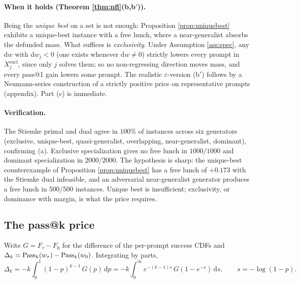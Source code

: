 \paragraph{When it holds (Theorem \ref{thm:nfl}(b,b$'$)).}
Being the \emph{unique best} on a set is not enough: Proposition
\ref{prop:uniquebest} exhibits a unique-best instance with a free lunch, where a
near-generalist absorbs the defunded mass. What suffices is \emph{exclusivity}.
Under Assumption \ref{ass:spec}, any $\mathrm{d}w$ with $\mathrm{d}w_j<0$ (one
exists whenever $\mathrm{d}w\ne0$) strictly lowers every prompt in
$X_j^{\mathrm{excl}}$, since only $j$ solves them; so no non-regressing direction
moves mass, and every pass@1 gain lowers some prompt. The realistic
$\varepsilon$-version (b$'$) follows by a Neumann-series construction of a strictly
positive price on representative prompts (appendix). Part (c) is immediate.

\paragraph{Verification.}
The Stiemke primal and dual agree in $100\%$ of instances across six generators
(exclusive, unique-best, quasi-generalist, overlapping, near-generalist,
dominant), confirming (a). Exclusive specialization gives no free lunch in
$1000/1000$ and dominant specialization in $2000/2000$. The hypothesis is sharp:
the unique-best counterexample of Proposition \ref{prop:uniquebest} has a free
lunch of $+0.173$ with the Stiemke dual infeasible, and an adversarial
near-generalist generator produces a free lunch in $500/500$ instances. Unique
best is insufficient; exclusivity, or dominance with margin, is what the price
requires.

\subsection{The pass@k price}
\label{sec:passkprice}

Write $G=F_\tau-F_0$ for the difference of the per-prompt success CDFs and
$\Delta_k=\mathrm{Pass}_k(w_\tau)-\mathrm{Pass}_k(w_0)$. Integrating by parts,
\begin{equation}
\label{eq:deltak}
\Delta_k=-k\int_0^1 (1-p)^{k-1}\,G(p)\,\mathrm{d}p
        =-k\int_0^\infty e^{-(k-1)s}\,G(1-e^{-s})\,\mathrm{d}s,
\qquad s=-\log(1-p).
\end{equation}

